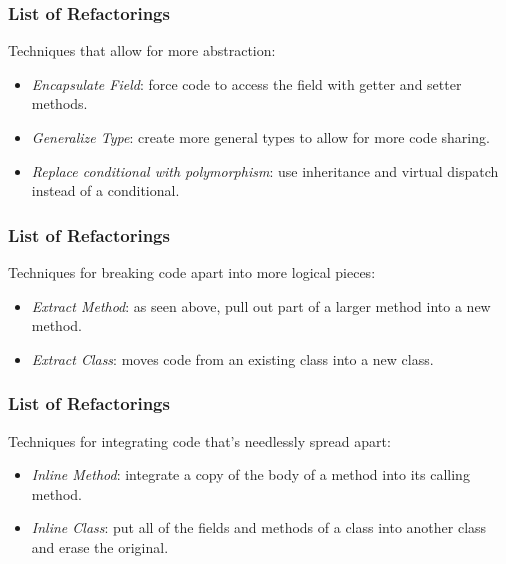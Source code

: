\begin{frame}
\frametitle{List of Refactorings}
\begin{changemargin}{1cm}



Techniques that allow for more abstraction:
\begin{itemize}
\item \emph{Encapsulate Field}: force code to access the field with getter and setter methods.
\item \emph{Generalize Type}: create more general types to allow for more code sharing.
\item \emph{Replace conditional with polymorphism}: use inheritance and virtual dispatch instead of a conditional.
\end{itemize}


\end{changemargin}
\end{frame}

\begin{frame}
\frametitle{List of Refactorings}
\begin{changemargin}{1cm}

Techniques for breaking code apart into more logical pieces:
\begin{itemize}
\item \emph{Extract Method}: as seen above, pull out part of a larger method into a new method.
\item \emph{Extract Class}: moves code from an existing class into a new class.
\end{itemize}

\end{changemargin}
\end{frame}


\begin{frame}
\frametitle{List of Refactorings}
\begin{changemargin}{1cm}
Techniques for integrating code that's needlessly spread apart:
\begin{itemize}
\item \emph{Inline Method}: integrate a copy of the body of a method into its calling method.
\item \emph{Inline Class}: put all of the fields and methods of a class into another class and erase the original.
\end{itemize}

\end{changemargin}
\end{frame}


